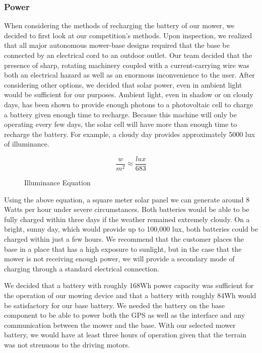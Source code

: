 \documentclass[12pt,letterpaper]{article}
\begin{document}
\subsubsection{Power}
When considering the methods of recharging the battery of our mower, we decided
to first look at our competition's methods. Upon inspection, we realized that
all major autonomous mower-base designs required that the base be connected by
an electrical cord to an outdoor outlet. Our team decided that the presence of
sharp, rotating machinery coupled with a current-carrying wire was both an
electrical hazard as well as an enormous inconvenience to the user. After
considering other options, we decided that solar power, even in ambient light
would be sufficient for our purposes.\autocite{radiometry} Ambient light, even
in shadow or on cloudy days, has been shown to provide enough photons to a
photovoltaic cell to charge a battery given enough time to recharge. Because
this machine will only be operating every few days, the solar cell will have
more than enough time to recharge the battery. For example, a cloudy day
provides approximately 5000 lux of illuminance.
 
\begin{figure}[h!]
\[
	\dfrac{w}{m^2} \approx \dfrac{lux}{683}
\]
\caption{Illuminance Equation}
\end{figure}

Using the above equation, a square meter solar panel we can generate
around 8 Watts per hour under severe circumstances.\autocite{radiation} Both
batteries would be able to be fully charged within three days if the weather remained extremely cloudy. On a bright, sunny day,
which would provide up to 100,000 lux, both batteries could be charged within
just a few hours. We recommend that the customer places the base in a place that
has a high exposure to sunlight, but in the case that the mower is not receiving
enough power, we will provide a secondary mode of charging through a standard
electrical connection.

We decided that a battery with roughly 168Wh power capacity was sufficient for
the operation of our mowing device and that a battery with roughly 84Wh would be
satisfactory for our base battery. We needed the battery on the base component
to be able to power both the GPS as well as the interface and any communication
between the mower and the base. With our selected mower battery, we would have
at least three hours of operation given that the terrain was not strenuous to
the driving motors.
\end{document}
